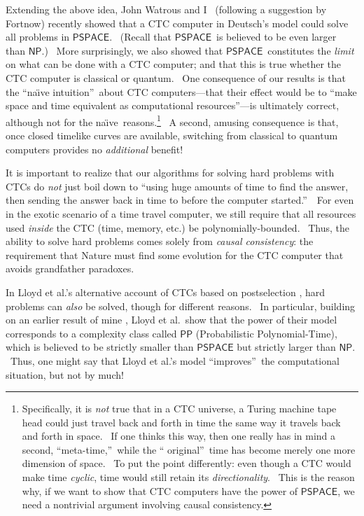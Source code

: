 \documentclass[11pt,onecolumn]{article}%
\begin{document}
Extending the above idea, John Watrous and I \cite{awat}\ (following a
suggestion by Fortnow) recently showed that a CTC computer in Deutsch's model
could solve all problems in $\mathsf{PSPACE}$. \ (Recall that $\mathsf{PSPACE}%
$\ is believed to be even larger than $\mathsf{NP}$.) \ More surprisingly, we
also showed that $\mathsf{PSPACE}$\ constitutes the \textit{limit} on what can
be done with a CTC computer; and that this is true whether the CTC computer is
classical or quantum. \ One consequence of our results is that the
\textquotedblleft na\"{\i}ve intuition\textquotedblright\ about CTC
computers---that their effect would be to \textquotedblleft make space and
time equivalent as computational resources\textquotedblright---is ultimately
correct, although not for the na\"{\i}ve\ reasons.\footnote{Specifically, it
is \textit{not} true that in a CTC universe, a Turing machine tape head could
just travel back and forth in time the same way it travels back and forth in
space. \ If one thinks this way, then one really has in mind a second,
\textquotedblleft meta-time,\textquotedblright\ while the \textquotedblleft
original\textquotedblright\ time has become merely one more dimension of
space. \ To put the point differently: even though a CTC would make time
\textit{cyclic}, time would still retain its \textit{directionality}. \ This
is the reason why, if we want to show that CTC computers have the power of
$\mathsf{PSPACE}$, we need a nontrivial argument involving causal
consistency.} \ A second, amusing consequence is that, once closed timelike
curves are available, switching from classical to quantum computers provides
no \textit{additional} benefit!

It is important to realize that our algorithms for solving hard problems with
CTCs do \textit{not} just boil down to \textquotedblleft using huge amounts of
time to find the answer, then sending the answer back in time to before the
computer started.\textquotedblright\ \ For even in the exotic scenario of a
time travel computer, we still require that all resources used \textit{inside}
the CTC (time, memory, etc.) be polynomially-bounded. \ Thus, the ability to
solve hard problems comes solely from \textit{causal consistency}: the
requirement that Nature must find some evolution for the CTC computer that
avoids grandfather paradoxes.

In Lloyd et al.'s alternative account of CTCs based on postselection
\cite{lmggs}, hard problems can \textit{also} be solved, though for different
reasons. \ In particular, building on an earlier result of mine \cite{aar:pp},
Lloyd et al.\ show that the power of their model corresponds to a complexity
class called $\mathsf{PP}$ (Probabilistic Polynomial-Time), which is believed
to be strictly smaller than $\mathsf{PSPACE}$ but strictly larger than
$\mathsf{NP}$. \ Thus, one might say that Lloyd et al.'s model
\textquotedblleft improves\textquotedblright\ the computational situation, but
not by much!
\end{document}
